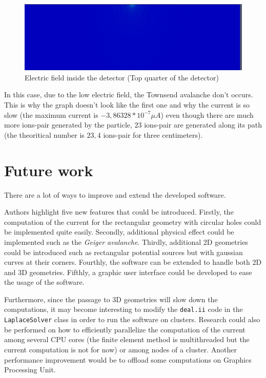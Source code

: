 \documentclass[11pt]{article}
\begin{document}
				\begin{figure}[H]
				  \center
				  \includegraphics[scale=0.4]{images/applications/electric_field.png}
				  \caption{Electric field inside the detector (Top quarter of the detector)}
				  \label{fig:electric_field}
				\end{figure}

				In this case, due to the low electric field, the Townsend avalanche don't occurs. This is why the graph doesn't
				look like the first one and why the current is so slow (the maximum current is $-3,86328*10^{-7}\mu A$) even though
				there are much more ions-pair generated by the particle, $23$ ions-pair are generated along its path (the theoritical
				number is $23,4$ ions-pair for three centimeters).

\section{Future work}

	There are a lot of ways to improve and extend the developed software.

	Authors highlight five new features that could be introduced. Firstly, the
	computation of the current for the
	rectangular geometry with circular holes could be implemented quite easily.
	Secondly, additional physical effect
	could be implemented such as the \textit{Geiger avalanche}. Thirdly,
	additional 2D geometries could be introduced such as
	rectangular potential sources but with gaussian curves at their corners.
	Fourthly, the software can be extended to handle both 2D and 3D geometries.
	Fifthly, a graphic user interface could be developed to ease the usage of the
	software.

	Furthermore, since the passage to 3D geometries will slow down the computations,
	it may become interesting to modify the \texttt{deal.ii} code in the
	\texttt{LaplaceSolver} class in order to run the software on clusters.
	Research could also be performed on how to efficiently parallelize the
	computation of the current among several CPU cores (the finite element method
	is multithreaded but the current computation is not for now) or among nodes of a cluster.
	Another performance improvement would be to offload some computations on
	Graphics Processing Unit.
\end{document}

